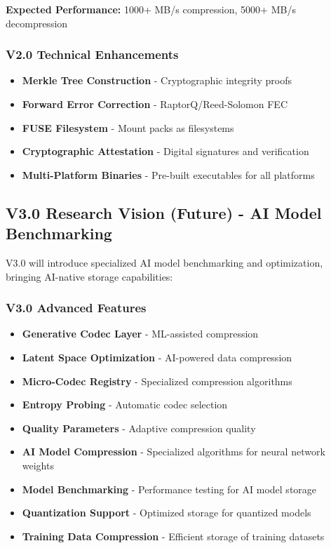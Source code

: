 \documentclass[11pt,a4paper]{article}
\begin{document}
	\textbf{Expected Performance:} 1000+ MB/s compression, 5000+ MB/s decompression

	\subsubsection{V2.0 Technical Enhancements}
	\begin{itemize}
		\item \textbf{Merkle Tree Construction} - Cryptographic integrity proofs
		\item \textbf{Forward Error Correction} - RaptorQ/Reed-Solomon FEC
		\item \textbf{FUSE Filesystem} - Mount packs as filesystems
		\item \textbf{Cryptographic Attestation} - Digital signatures and verification
		\item \textbf{Multi-Platform Binaries} - Pre-built executables for all platforms
	\end{itemize}

	\subsection{V3.0 Research Vision (Future) - AI Model Benchmarking}

	V3.0 will introduce specialized AI model benchmarking and optimization, bringing AI-native storage capabilities:

	\subsubsection{V3.0 Advanced Features}
	\begin{itemize}
		\item \textbf{Generative Codec Layer} - ML-assisted compression
		\item \textbf{Latent Space Optimization} - AI-powered data compression
		\item \textbf{Micro-Codec Registry} - Specialized compression algorithms
		\item \textbf{Entropy Probing} - Automatic codec selection
		\item \textbf{Quality Parameters} - Adaptive compression quality
		\item \textbf{AI Model Compression} - Specialized algorithms for neural network weights
		\item \textbf{Model Benchmarking} - Performance testing for AI model storage
		\item \textbf{Quantization Support} - Optimized storage for quantized models
		\item \textbf{Training Data Compression} - Efficient storage of training datasets
	\end{itemize}
\end{document}
